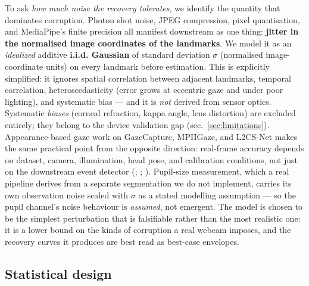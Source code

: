 \documentclass[
]{article}
\begin{document}
To ask \emph{how much noise the recovery tolerates}, we identify the
quantity that dominates corruption. Photon shot noise, JPEG compression,
pixel quantisation, and MediaPipe's finite precision all manifest
downstream as one thing: \textbf{jitter in the normalised image
coordinates of the landmarks}. We model it as an \emph{idealized}
additive \textbf{i.i.d. Gaussian} of standard deviation \(\sigma\)
(normalised image-coordinate units) on every landmark before estimation.
This is explicitly simplified: it ignores spatial correlation between
adjacent landmarks, temporal correlation, heteroscedasticity (error
grows at eccentric gaze and under poor lighting), and systematic bias
--- and it is \emph{not} derived from sensor optics. Systematic
\emph{biases} (corneal refraction, kappa angle, lens distortion) are
excluded entirely; they belong to the device validation gap
(sec.~\ref{sec:limitations}). Appearance-based gaze work on GazeCapture,
MPIIGaze, and L2CS-Net makes the same practical point from the opposite
direction: real-frame accuracy depends on dataset, camera, illumination,
head pose, and calibration conditions, not just on the downstream event
detector (;
;
). Pupil-size
measurement, which a real pipeline derives from a separate segmentation
we do not implement, carries its own observation noise scaled with
\(\sigma\) as a stated modelling assumption --- so the pupil channel's
noise behaviour is \emph{assumed}, not emergent. The model is chosen to
be the simplest perturbation that is falsifiable rather than the most
realistic one: it is a lower bound on the kinds of corruption a real
webcam imposes, and the recovery curves it produces are best read as
best-case envelopes.

\subsection{Statistical design}\label{statistical-design}
\end{document}
